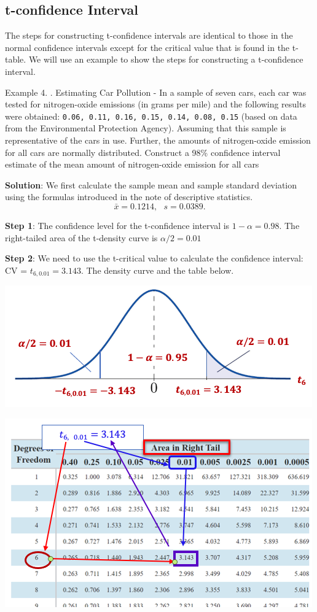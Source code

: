 \documentclass[
]{book}
\begin{document}
\hypertarget{t-confidence-interval}{%
\subsection{t-confidence Interval}\label{t-confidence-interval}}

The steps for constructing t-confidence intervals are identical to those in the normal confidence intervals except for the critical value that is found in the t-table. We will use an example to show the steps for constructing a t-confidence interval.

Example 4. . Estimating Car Pollution - In a sample of seven cars, each car was tested for nitrogen-oxide emissions (in grams per mile) and the following results were obtained: \texttt{0.06,\ 0.11,\ 0.16,\ 0.15,\ 0.14,\ 0.08,\ 0.15} (based on data from the Environmental Protection Agency). Assuming that this sample is representative of the cars in use. Further, the amounts of nitrogen-oxide emission for all cars are normally distributed. Construct a 98\% confidence interval estimate of the mean amount of nitrogen-oxide emission for all cars

\textbf{Solution}: We first calculate the sample mean and sample standard deviation using the formulas introduced in the note of descriptive statistics.
\[
\bar{x} = 0.1214, \ \ \ s = 0.0389.
\]

\textbf{Step 1}: The confidence level for the t-confidence interval is \(1-\alpha = 0.98\). The right-tailed area of the t-density curve is \(\alpha/2 = 0.01\)

\textbf{Step 2}: We need to use the t-critical value to calculate the confidence interval: CV = \(t_{6, 0.01} = 3.143\). The density curve and the table below.

\begin{center}\includegraphics[width=0.7\linewidth]{week07/example04CV} \end{center}

\begin{center}\includegraphics[width=0.7\linewidth]{week07/example04Table} \end{center}
\end{document}

